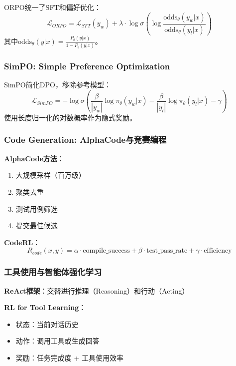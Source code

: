 \documentclass[12pt,a4paper]{article}
\begin{document}
ORPO统一了SFT和偏好优化：
\begin{equation}
\mathcal{L}_{ORPO} = \mathcal{L}_{SFT}(y_w) + \lambda \cdot \log\sigma(\log\frac{\text{odds}_\theta(y_w|x)}{\text{odds}_\theta(y_l|x)})
\end{equation}
其中$\text{odds}_\theta(y|x) = \frac{P_\theta(y|x)}{1-P_\theta(y|x)}$。

\subsubsection{SimPO: Simple Preference Optimization}

SimPO简化DPO，移除参考模型：
\begin{equation}
\mathcal{L}_{SimPO} = -\log\sigma(\frac{\beta}{|y_w|}\log\pi_\theta(y_w|x) - \frac{\beta}{|y_l|}\log\pi_\theta(y_l|x) - \gamma)
\end{equation}
使用长度归一化的对数概率作为隐式奖励。

\subsubsection{Code Generation: AlphaCode与竞赛编程}

\textbf{AlphaCode方法}：
\begin{enumerate}
    \item 大规模采样（百万级）
    \item 聚类去重
    \item 测试用例筛选
    \item 提交最佳候选
\end{enumerate}

\textbf{CodeRL}：
\begin{equation}
R_{code}(x, y) = \alpha \cdot \text{compile\_success} + \beta \cdot \text{test\_pass\_rate} + \gamma \cdot \text{efficiency}
\end{equation}

\subsubsection{工具使用与智能体强化学习}

\textbf{ReAct框架}：交替进行推理（Reasoning）和行动（Acting）

\textbf{RL for Tool Learning}：
\begin{itemize}
    \item 状态：当前对话历史
    \item 动作：调用工具或生成回答
    \item 奖励：任务完成度 + 工具使用效率
\end{itemize}
\end{document}
